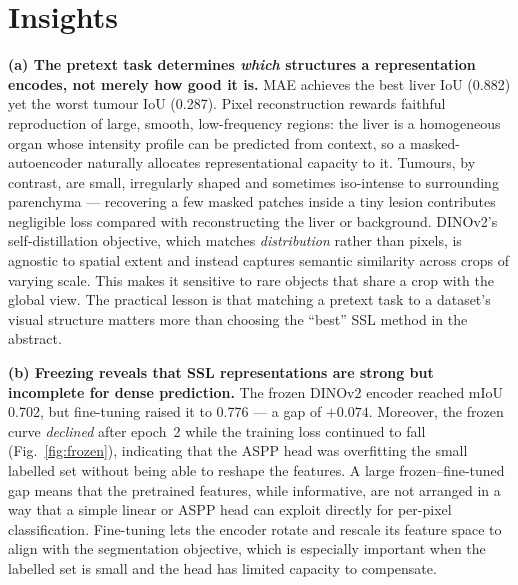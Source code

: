 \documentclass[conference]{IEEEtran}
\begin{document}
\section{Insights}

\textbf{(a) The pretext task determines \emph{which} structures a
representation encodes, not merely how good it is.}
MAE achieves the best liver IoU (0.882) yet the worst tumour IoU (0.287).
Pixel reconstruction rewards faithful reproduction of large, smooth,
low-frequency regions: the liver is a homogeneous organ whose intensity
profile can be predicted from context, so a masked-autoencoder naturally
allocates representational capacity to it. Tumours, by contrast, are small,
irregularly shaped and sometimes iso-intense to surrounding parenchyma ---
recovering a few masked patches inside a tiny lesion contributes negligible
loss compared with reconstructing the liver or background. DINOv2's
self-distillation objective, which matches \emph{distribution} rather than
pixels, is agnostic to spatial extent and instead captures semantic
similarity across crops of varying scale. This makes it sensitive to rare
objects that share a crop with the global view. The practical lesson is
that matching a pretext task to a dataset's visual structure matters more
than choosing the ``best'' SSL method in the abstract.

\textbf{(b) Freezing reveals that SSL representations are strong but
incomplete for dense prediction.}
The frozen DINOv2 encoder reached mIoU 0.702, but fine-tuning raised it to
0.776 --- a gap of $+0.074$. Moreover, the frozen curve \emph{declined}
after epoch~2 while the training loss continued to fall
(Fig.~\ref{fig:frozen}), indicating that the ASPP head was overfitting the
small labelled set without being able to reshape the features. A large
frozen--fine-tuned gap means that the pretrained features, while
informative, are not arranged in a way that a simple linear or ASPP head can
exploit directly for per-pixel classification. Fine-tuning lets the encoder
rotate and rescale its feature space to align with the segmentation
objective, which is especially important when the labelled set is small and
the head has limited capacity to compensate.
\end{document}

